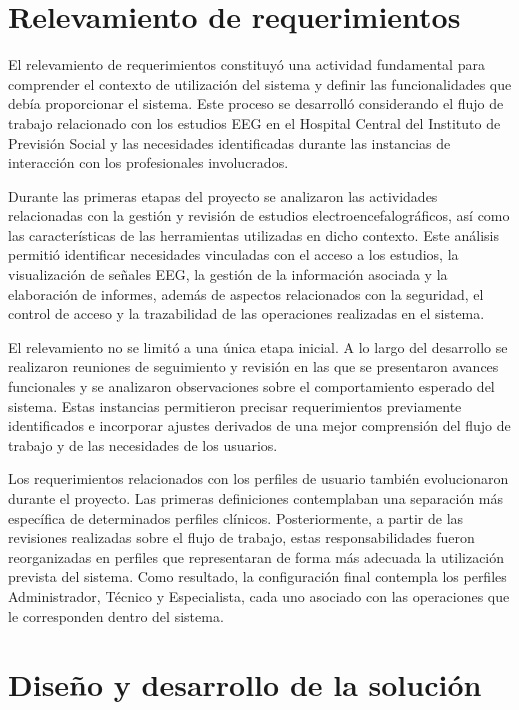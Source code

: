 \section{Relevamiento de requerimientos}
\label{sec:relevamiento-requerimientos}

El relevamiento de requerimientos constituyó una actividad fundamental para
comprender el contexto de utilización del sistema y definir las funcionalidades
que debía proporcionar el sistema. Este proceso se desarrolló considerando el
flujo de trabajo relacionado con los estudios EEG en el Hospital Central del
Instituto de Previsión Social y las necesidades identificadas durante las
instancias de interacción con los profesionales involucrados.

Durante las primeras etapas del proyecto se analizaron las actividades
relacionadas con la gestión y revisión de estudios electroencefalográficos,
así como las características de las herramientas utilizadas en dicho contexto.
Este análisis permitió identificar necesidades vinculadas con el acceso a los
estudios, la visualización de señales EEG, la gestión de la información
asociada y la elaboración de informes, además de aspectos relacionados con la
seguridad, el control de acceso y la trazabilidad de las operaciones realizadas
en el sistema.

El relevamiento no se limitó a una única etapa inicial. A lo largo del
desarrollo se realizaron reuniones de seguimiento y revisión en las que se
presentaron avances funcionales y se analizaron observaciones sobre el
comportamiento esperado del sistema. Estas instancias permitieron precisar
requerimientos previamente identificados e incorporar ajustes derivados de una
mejor comprensión del flujo de trabajo y de las necesidades de los usuarios.

Los requerimientos relacionados con los perfiles de usuario también
evolucionaron durante el proyecto. Las primeras definiciones contemplaban una
separación más específica de determinados perfiles clínicos. Posteriormente,
a partir de las revisiones realizadas sobre el flujo de trabajo, estas
responsabilidades fueron reorganizadas en perfiles que representaran de forma
más adecuada la utilización prevista del sistema. Como resultado, la
configuración final contempla los perfiles Administrador, Técnico y
Especialista, cada uno asociado con las operaciones que le corresponden dentro
del sistema.

\section{Diseño y desarrollo de la solución}
\label{sec:diseno-desarrollo-solucion}

